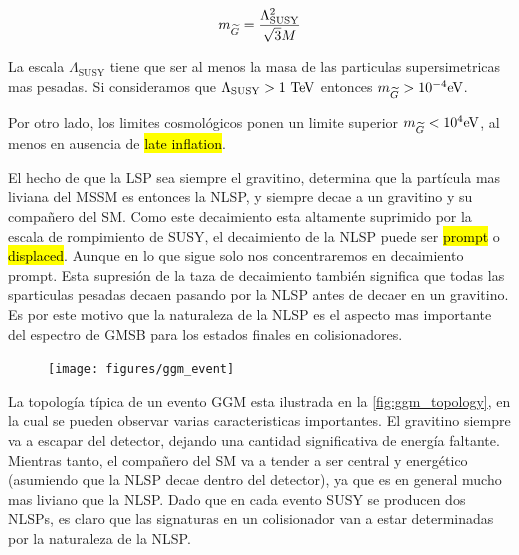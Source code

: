 \begin{equation}
  m_{\widetilde{G}} = \frac{\Lambda^2_{\text{SUSY}}}{\sqrt{3}M}
\end{equation}

La escala $\Lambda_{\text{SUSY}}$ tiene que ser al menos la masa de
las particulas supersimetricas mas pesadas. Si consideramos que
$\Lambda_{\text{SUSY}} > 1 \tev$ entonces $m_{\widetilde{G}} > 10^{-4}
\mathrm{eV}$.

Por otro lado, los limites cosmológicos
\cite{PhysRevLett.48.223,Moroi:1993mb} ponen un limite superior
$m_{\widetilde{G}} < 10^4 \text{eV}$, al menos en ausencia de \hl{late inflation}.


El hecho de que la LSP sea siempre el gravitino, determina que la
partícula mas liviana del MSSM es entonces la NLSP, y siempre decae a
un gravitino y su compañero del SM. Como este decaimiento esta
altamente suprimido por la escala de rompimiento de SUSY, el
decaimiento de la NLSP puede ser \hl{prompt} o \hl{displaced}. Aunque
en lo que sigue solo nos concentraremos en decaimiento prompt. Esta
supresión de la taza de decaimiento también significa que todas las
sparticulas pesadas decaen pasando por la NLSP antes de decaer en un
gravitino. Es por este motivo que la naturaleza de la NLSP es el
aspecto mas importante del espectro de GMSB para los estados finales
en colisionadores.

\begin{figure}[!htbp]
  \centering \texttt{[image: figures/ggm\_event]}
\end{figure}

La topología típica de un evento GGM esta ilustrada en la
\cref{fig:ggm_topology}, en la cual se pueden observar varias caracteristicas
importantes. El gravitino siempre va a escapar del
detector, dejando una cantidad significativa de energía faltante.
Mientras tanto, el compañero del SM va a tender a ser central y
energético (asumiendo que la NLSP decae dentro del detector), ya que
es en general mucho mas liviano que la NLSP. Dado que en cada evento
SUSY se producen dos NLSPs, es claro que las signaturas en un
colisionador van a estar determinadas por la naturaleza de la NLSP.





